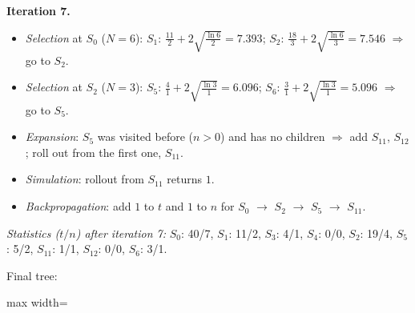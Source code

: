 \documentclass[11pt,a4paper]{article}
\begin{document}
\begin{solbox}
\smallskip
\textbf{Iteration 7.}
\begin{itemize}[leftmargin=1.5em,itemsep=1pt]
\item \emph{Selection} at $S_{0}$ ($N=6$): $S_{1}$: $\frac{11}{2} + 2\sqrt{\frac{\ln 6}{2}} = 7.393$; $S_{2}$: $\frac{18}{3} + 2\sqrt{\frac{\ln 6}{3}} = 7.546$ $\Rightarrow$ go to \textbf{$S_{2}$}.
\item \emph{Selection} at $S_{2}$ ($N=3$): $S_{5}$: $\frac{4}{1} + 2\sqrt{\frac{\ln 3}{1}} = 6.096$; $S_{6}$: $\frac{3}{1} + 2\sqrt{\frac{\ln 3}{1}} = 5.096$ $\Rightarrow$ go to \textbf{$S_{5}$}.
\item \emph{Expansion}: $S_{5}$ was visited before ($n>0$) and has no children $\Rightarrow$ add $S_{11}$, $S_{12}$; roll out from the first one, \textbf{$S_{11}$}.
\item \emph{Simulation}: rollout from $S_{11}$ returns $1$.
\item \emph{Backpropagation}: add $1$ to $t$ and $1$ to $n$ for $S_{0}$ $\to$ $S_{2}$ $\to$ $S_{5}$ $\to$ $S_{11}$.
\end{itemize}
\textit{Statistics ($t/n$) after iteration 7:} $S_{0}$: 40/7, $S_{1}$: 11/2, $S_{3}$: 4/1, $S_{4}$: 0/0, $S_{2}$: 19/4, $S_{5}$: 5/2, $S_{11}$: 1/1, $S_{12}$: 0/0, $S_{6}$: 3/1.\par Final tree:\begin{center}
\begin{adjustbox}{max width=\linewidth}
\end{adjustbox}
\end{center}
\end{solbox}
\end{document}
